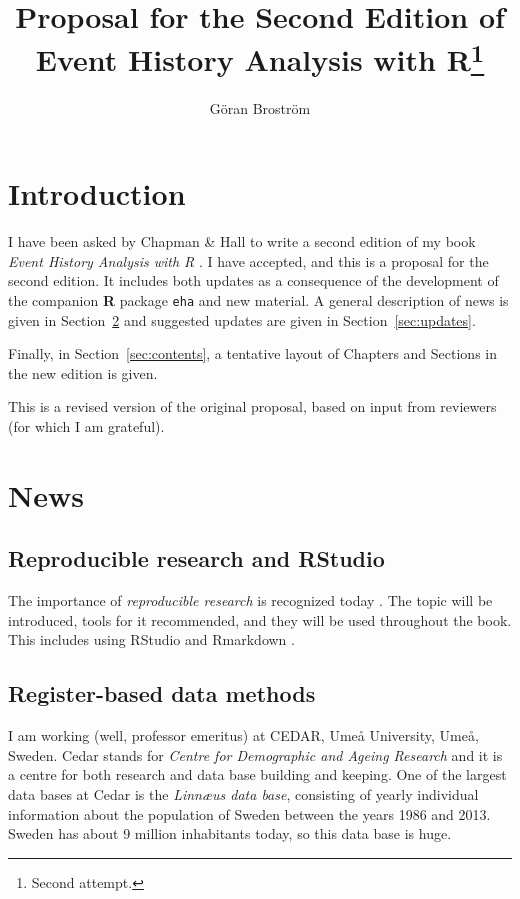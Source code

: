 \documentclass[a4paper,11pt]{article}
\title{Proposal for the Second Edition of \\
  Event History Analysis with R\footnote{Second attempt.}}
\author{Göran Broström}
\begin{document}
\maketitle

\tableofcontents

\section{Introduction}

I have been asked by Chapman \& Hall to write a second edition of my book
\emph{Event History Analysis with R} \citep{ehar12}. I have accepted, and
this is a proposal for the second edition. It includes both updates as a
consequence of the development of the companion {\bf R} \citep{cran}
package {\tt eha} \citep{eha} and new material. A general description of
news is given in Section~\ref{sec:news} and suggested updates are given in
Section~\ref{sec:updates}.

Finally, in Section~\ref{sec:contents}, a tentative layout of Chapters and
Sections in the new edition is given.

This is a revised version of the original proposal, based on input from reviewers 
(for which I am grateful).

\section{News} \label{sec:news}

\subsection{Reproducible research and RStudio}

The importance of \emph{reproducible research} is recognized today
\citep{gandrud15,vsflrp}. The topic will be introduced,  tools for it
recommended, and they will be used throughout the book. This includes using 
RStudio \citep{rstudio} and Rmarkdown \citep{rmarkdown}.

\subsection{Register-based data methods}

I am working (well, professor emeritus) at {\sc CEDAR}, Umeå University,
Umeå, Sweden. {\sc Cedar} 
stands for  \emph{Centre for Demographic and Ageing Research} and it is a
centre for both research and data base building and keeping. One of the
largest data bases at {\sc Cedar} is the \emph{Linn{\ae}us data base},
consisting of yearly individual information about the population of Sweden
between the years 1986 and 2013. Sweden has about 9 million inhabitants
today, so this data base is huge.
\end{document}
